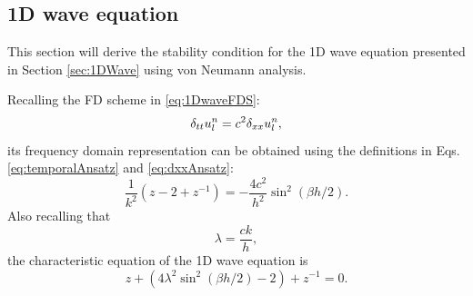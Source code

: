 {{\subsection{1D wave equation}\label{sec:vonNeumann1DWave}
This section will derive the stability condition for the 1D wave equation presented in Section \ref{sec:1DWave} using von Neumann analysis.

Recalling the FD scheme in \eqref{eq:1DwaveFDS}:
\begin{equation*}
    \delta_{tt} u_l^n = c^2 \delta_{xx} u_l^n,
\end{equation*}
its frequency domain representation can be obtained using the definitions in Eqs. \eqref{eq:temporalAnsatz} and \eqref{eq:dxxAnsatz}:
\begin{equation}
    \frac{1}{k^2}\left(z - 2 + z^{-1}\right) = -\frac{4c^2}{h^2}\sin^2\left(\beta h / 2\right).
\end{equation}
Also recalling that
\begin{equation*}
    \lambda = \frac{ck}{h},
\end{equation*}
the characteristic equation of the 1D wave equation is
\begin{equation}\label{eq:1dWaveCharacteristic}
    z + \left(4\lambda^2\sin^2(\beta h / 2) -2\right) + z^{-1} = 0.
\end{equation}
}}
